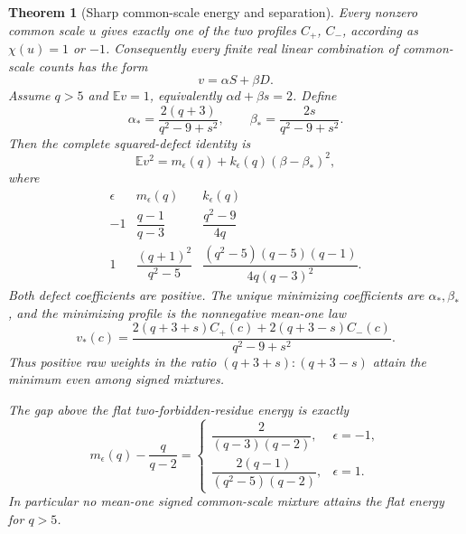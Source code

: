 \documentclass[11pt]{article}
\newtheorem{theorem}{Theorem}[section]
\begin{document}
\begin{theorem}[Sharp common-scale energy and separation]
\label{thm:commonScaleOptimum}
Every nonzero common scale \(u\) gives exactly one of the two
profiles \(C_+\), \(C_-\), according as \(\chi(u)=1\) or \(-1\).
Consequently every finite real linear combination of common-scale
counts has the form
\[
             v=\alpha S+\beta D.
\]
Assume \(q>5\) and \(\mathbb E v=1\), equivalently
\(\alpha d+\beta s=2\). Define
\[
 \alpha_*=\frac{2(q+3)}{q^2-9+s^2},\qquad
 \beta_*=\frac{2s}{q^2-9+s^2}.
\]
Then the complete squared-defect identity is
\[
 \mathbb E v^2=m_\epsilon(q)
                    +k_\epsilon(q)(\beta-\beta_*)^2,
\]
where
\[
\begin{array}{c|c|c}
 \epsilon&m_\epsilon(q)&k_\epsilon(q)\\ \hline
 -1&\dfrac{q-1}{q-3}&\dfrac{q^2-9}{4q}\\[5pt]
 1&\dfrac{(q+1)^2}{q^2-5}&
 \dfrac{(q^2-5)(q-5)(q-1)}{4q(q-3)^2}.
\end{array}
\]
Both defect coefficients are positive. The unique minimizing
coefficients are \(\alpha_*,\beta_*\), and the minimizing profile
is the nonnegative mean-one law
\[
 v_*(c)=
 \frac{2(q+3+s)C_+(c)+2(q+3-s)C_-(c)}{q^2-9+s^2}.
\]
Thus positive raw weights in the ratio
\((q+3+s):(q+3-s)\) attain the minimum even among signed mixtures.

The gap above the flat two-forbidden-residue energy is exactly
\[
 m_\epsilon(q)-\frac{q}{q-2}
 =
 \begin{cases}
 \dfrac{2}{(q-3)(q-2)},&\epsilon=-1,\\[5pt]
 \dfrac{2(q-1)}{(q^2-5)(q-2)},&\epsilon=1.
 \end{cases}
\]
In particular no mean-one signed common-scale mixture attains the
flat energy for \(q>5\).
\end{theorem}
\end{document}
